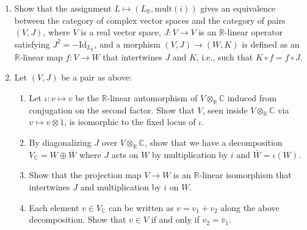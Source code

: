 \documentclass[12pt]{article}
\begin{document}
\begin{problem}{2}
    \begin{enumerate}
        \item Show that the assignment $L \mapsto (L_{\mathbb{R}}, \text{mult}(i))$ gives an equivalence between the category of complex vector spaces and the category of pairs $(V, J)$, where $V$ is a real vector space, $J : V \to V$ is an $\mathbb{R}$-linear operator satisfying $J^2 = -\mathrm{Id}_{L_\mathbb{R}}$, and a morphism $(V, J) \to (W, K)$ is defined as an $\mathbb{R}$-linear map $f : V \to W$ that intertwines $J$ and $K$, i.e., such that $K \circ f = f \circ J$.

        \item Let $(V, J)$ be a pair as above:
        \begin{enumerate}
            \item Let $\iota : v \mapsto v$ be the $\mathbb{R}$-linear automorphism of $V \otimes_{\mathbb{R}} \mathbb{C}$ induced from conjugation on the second factor. Show that $V$, seen inside $V \otimes_{\mathbb{R}} \mathbb{C}$ via $v \mapsto v \otimes 1$, is isomorphic to the fixed locus of $\iota$.
            \item By diagonalizing $J$ over $V \otimes_{\mathbb{R}} \mathbb{C}$, show that we have a decomposition $V_{\mathbb{C}} = W \oplus \bar{W}$ where $J$ acts on $W$ by multiplication by $i$ and $\bar{W} = \iota(W)$.
            \item Show that the projection map $V \to W$ is an $\mathbb{R}$-linear isomorphism that intertwines $J$ and multiplication by $i$ on $W$.
            \item Each element $v \in V_{\mathbb{C}}$ can be written as $v = v_1 + v_2$ along the above decomposition. Show that $v \in V$ if and only if $v_2 = \bar{v}_1$.
        \end{enumerate}
    \end{enumerate}
\end{problem}
\newpage
\end{document}
